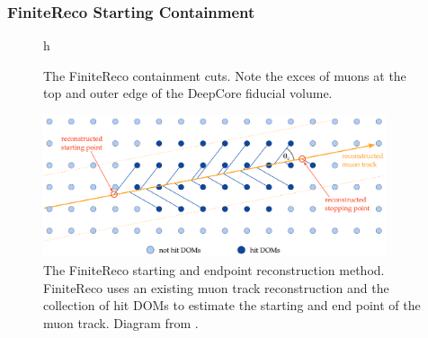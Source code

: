 \subsubsection{FiniteReco Starting Containment}
\begin{figure}{h}%
	\centering
	\caption[The FiniteReco Containment Cuts]{The FiniteReco containment cuts. Note the exces of muons at the top and outer edge of the DeepCore fiducial volume.}%
	\label{fig:finitereco_cuts}%
\end{figure}

\begin{figure}
\centering
\includegraphics[width=0.9\textwidth]{finitereco_diagram.png} 
\caption[Diagram Describing the FiniteReco Method]{The FiniteReco starting and endpoint reconstruction method. FiniteReco uses an existing muon track reconstruction and the collection of hit DOMs to estimate the starting and end point of the muon track. Diagram from \cite{Thesis-Euler}.}
\label{fig:finitereco_diagram}
\end{figure}

